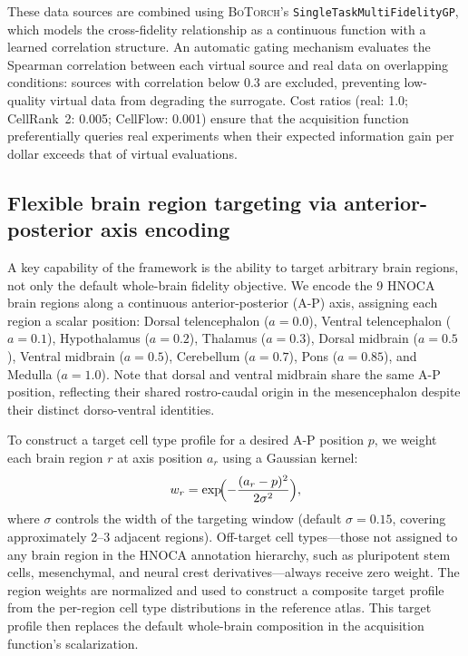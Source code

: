 \documentclass[times,twoside]{zHenriquesLab-StyleBioRxiv}
\newcommand{\botorch}{\textsc{BoTorch}}
\begin{document}
These data sources are combined using \botorch{}'s \texttt{SingleTaskMultiFidelityGP}, which models the cross-fidelity relationship as a continuous function with a learned correlation structure. An automatic gating mechanism evaluates the Spearman correlation between each virtual source and real data on overlapping conditions: sources with correlation below 0.3 are excluded, preventing low-quality virtual data from degrading the surrogate. Cost ratios (real: 1.0; CellRank~2: 0.005; CellFlow: 0.001) ensure that the acquisition function preferentially queries real experiments when their expected information gain per dollar exceeds that of virtual evaluations.

\subsection*{Flexible brain region targeting via anterior-posterior axis encoding}

A key capability of the framework is the ability to target arbitrary brain regions, not only the default whole-brain fidelity objective. We encode the 9 HNOCA brain regions along a continuous anterior-posterior (A-P) axis, assigning each region a scalar position: Dorsal telencephalon ($a{=}0.0$), Ventral telencephalon ($a{=}0.1$), Hypothalamus ($a{=}0.2$), Thalamus ($a{=}0.3$), Dorsal midbrain ($a{=}0.5$), Ventral midbrain ($a{=}0.5$), Cerebellum ($a{=}0.7$), Pons ($a{=}0.85$), and Medulla ($a{=}1.0$). Note that dorsal and ventral midbrain share the same A-P position, reflecting their shared rostro-caudal origin in the mesencephalon despite their distinct dorso-ventral identities.

To construct a target cell type profile for a desired A-P position $p$, we weight each brain region $r$ at axis position $a_r$ using a Gaussian kernel:
\begin{equation}
  w_r = \exp\!\Bigl(-\frac{(a_r - p)^2}{2\sigma^2}\Bigr),
\end{equation}
where $\sigma$ controls the width of the targeting window (default $\sigma{=}0.15$, covering approximately 2--3 adjacent regions). Off-target cell types---those not assigned to any brain region in the HNOCA annotation hierarchy, such as pluripotent stem cells, mesenchymal, and neural crest derivatives---always receive zero weight. The region weights are normalized and used to construct a composite target profile from the per-region cell type distributions in the reference atlas. This target profile then replaces the default whole-brain composition in the acquisition function's scalarization.
\end{document}
